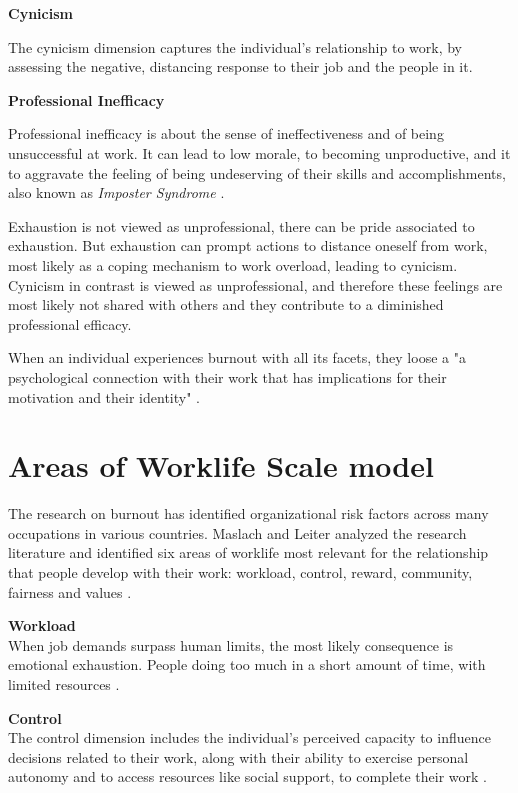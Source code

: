 \textbf{Cynicism}

The cynicism dimension captures the individual's relationship to work, by assessing the negative, distancing response to their job and the people in it.

\textbf{Professional Inefficacy}

Professional inefficacy is about the sense of ineffectiveness and of being unsuccessful at work. It can lead to low morale, to becoming unproductive, and it to aggravate the feeling of being undeserving of their skills and accomplishments, also known as \textit{Imposter Syndrome} \parencite{benisek_what_2022} \parencite{yerbo_yerbo_nodate}.

Exhaustion is not viewed as unprofessional, there can be pride associated to exhaustion. But exhaustion can prompt actions to distance oneself from work, most likely as a coping mechanism to work overload, leading to cynicism. Cynicism in contrast is viewed as unprofessional, and therefore these feelings are most likely not shared with others and they contribute to a diminished professional efficacy. 

When an individual experiences burnout with all its facets, they loose a "a psychological connection with their work that has implications for their motivation and their identity" \parencite[41]{maslach_understanding_2017}.

\section{Areas of Worklife Scale model}
The research on burnout has identified organizational risk factors across many occupations in various countries. Maslach and Leiter analyzed the research literature and identified six areas of worklife most relevant for the relationship that people develop with their work: workload, control, reward, community, fairness and values \parencite{brom_areas_2015}.

\textbf{Workload}\\
When job demands surpass human limits, the most likely consequence is emotional exhaustion. People doing too much in a short amount of time, with limited resources \parencites{brom_areas_2015}[44]{maslach_understanding_2017}.

\textbf{Control}\\
The control dimension includes the individual's perceived capacity to influence decisions related to their work, along with their ability to exercise personal autonomy and to access resources like social support, to complete their work \parencites{brom_areas_2015}.

